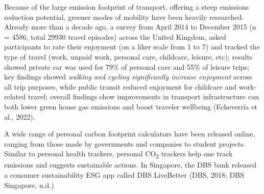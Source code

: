 \documentclass[
  12pt,
  letterpaper,
  DIV=11,
  numbers=noendperiod]{scrartcl}
\begin{document}
Because of the large emission footprint of transport, offering a steep
emissions reduction potential, greener modes of mobility have been
heavily researched. Already more than a decade ago, a survey from April
2014 to December 2015 (n = 4586, total 29930 travel episodes) across the
United Kingdom, asked participants to rate their enjoyment (on a liker
scale from 1 to 7) and tracked the type of travel (work, unpaid work,
personal care, childcare, leisure, etc); results showed private car was
used for 79\% of personal care and 55\% of leisure trips; key findings
showed \emph{walking and cycling significantly increase enjoyment}
across all trip purposes, while public transit reduced enjoyment for
childcare and work-related travel; overall findings show improvements in
transport infrastructure can both lower green house gas emissions and
boost traveler wellbeing (Echeverría et al., 2022).

A wide range of personal carbon footprint calculators have been released
online, ranging from those made by governments and companies to student
projects. Similar to personal health trackers, personal
CO\textsubscript{2} trackers help one track emissions and suggests
sustainable actions. In Singapore, the DBS bank released a consumer
sustainability ESG app called DBS LiveBetter (DBS, 2018; DBS Singapore,
n.d.)

\def\pandoctableshortcapt{A Selection of Personal Sustainability Apps}
\end{document}
